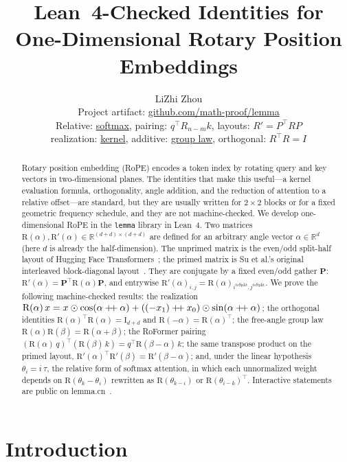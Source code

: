 \documentclass[11pt,a4paper]{article}
\title{Lean~4-Checked Identities for\\One-Dimensional Rotary Position Embeddings}
\author{LiZhi Zhou\\[0.3em]
\small Project artifact: \href{https://github.com/math-proof/lemma}{github.com/math-proof/lemma}\\[0.4em]
\small
Relative:
\href{http://www.lemma.cn/lean/?module=Tensor.DotSoftmaxDivDot_Stack_TDot.eq.Stack_Div_SumExp.of.Eq_Stack_Mul}{softmax},
\quad
pairing:
\href{http://www.lemma.cn/lean/?module=Tensor.DotDotSRotaryMatrix.eq.Dot_DotRotaryMatrixSub}{$q^\top R_{n-m}k$},
\quad
layouts:
\href{http://www.lemma.cn/lean/?module=Tensor.RotaryMatrix'.eq.DotDot_RotaryMatrix}{$R'=P^\top RP$}\\[0.25em]
realization:
\href{http://www.lemma.cn/lean/?module=Tensor.DotRotaryMatrix.eq.AddMulS}{kernel},
\quad
additive:
\href{http://www.lemma.cn/lean/?module=Tensor.DotRotaryMatrixS.eq.RotaryMatrixAdd}{group law},
\quad
orthogonal:
\href{http://www.lemma.cn/lean/?module=Tensor.DotT_RotaryMatrix.eq.Eye}{$R^\top R=I$}}
\date{}
\newcommand{\R}{\mathbb{R}}
\newcommand{\rot}{\mathrm{R}}
\newcommand{\eye}{\mathrm{I}}
\newcommand{\concat}{\mathbin{+\mkern-4mu+}}
\begin{document}
\maketitle

\begin{abstract}
Rotary position embedding (RoPE) encodes a token index by rotating query and key vectors in two-dimensional planes.
The identities that make this useful---a kernel evaluation formula, orthogonality, angle addition, and the reduction of attention to a relative offset---are standard, but they are usually written for $2\times 2$ blocks or for a fixed geometric frequency schedule, and they are not machine-checked.
We develop one-dimensional RoPE in the \texttt{lemma} library in Lean~4.
Two matrices \(\rot(\alpha),\rot'(\alpha)\in\R^{(d+d)\times(d+d)}\) are defined for an arbitrary angle vector \(\alpha\in\R^d\) (here \(d\) is already the half-dimension).
The unprimed matrix is the even/odd split-half layout of Hugging Face Transformers~\cite{huggingface_rope_utils}; the primed matrix is Su et al.'s original interleaved block-diagonal layout~\cite{su2021roformer}.
They are conjugate by a fixed even/odd gather \(\boldsymbol{P}\):
\(\rot'(\alpha)=\boldsymbol{P}^\top\rot(\alpha)\boldsymbol{P}\),
and entrywise
\(\rot'(\alpha)_{i,j}=\rot(\alpha)_{i^{\mathrm{toSplit}},j^{\mathrm{toSplit}}}\).
We prove the following machine-checked results:
the realization
\(\rot(\alpha)\,x = x\odot\cos(\alpha\concat\alpha)+((-x_1)\concat x_0)\odot\sin(\alpha\concat\alpha)\);
the orthogonal identities \(\rot(\alpha)^\top\rot(\alpha)=\eye_{d+d}\) and \(\rot(-\alpha)=\rot(\alpha)^\top\);
the free-angle group law \(\rot(\alpha)\rot(\beta)=\rot(\alpha+\beta)\);
the RoFormer pairing
\((\rot(\alpha)\,q)^\top(\rot(\beta)\,k)=q^\top\rot(\beta-\alpha)\,k\);
the same transpose product on the primed layout,
\(\rot'(\alpha)^\top\rot'(\beta)=\rot'(\beta-\alpha)\);
and, under the linear hypothesis \(\theta_i=i\,\tau\), the relative form of softmax attention, in which each unnormalized weight depends on \(\rot(\theta_k-\theta_i)\) rewritten as \(\rot(\theta_{k-i})\) or \(\rot(\theta_{i-k})^\top\).
Interactive statements are public on lemma.cn~\cite{lemma_rope_rel,lemma_rope_pair,lemma_rope_conj,lemma_rope_real,lemma_rope_add,lemma_rope_orth}.
\end{abstract}

\section{Introduction}
\label{sec:intro}
\end{document}

